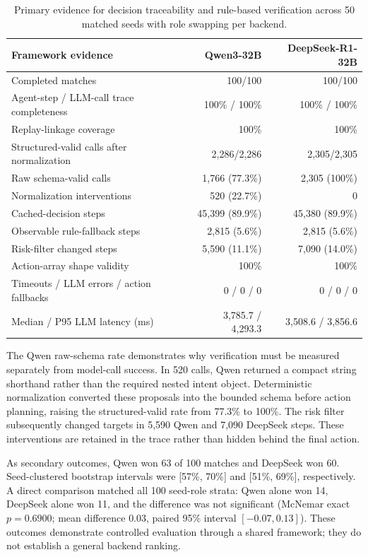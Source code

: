 \documentclass[11pt]{article}
\begin{document}
\begin{table}[t]
\centering
\small
\begin{tabular}{lrr}
\hline
Framework evidence & Qwen3-32B & DeepSeek-R1-32B \\
\hline
Completed matches & 100/100 & 100/100 \\
Agent-step / LLM-call trace completeness & 100\% / 100\% & 100\% / 100\% \\
Replay-linkage coverage & 100\% & 100\% \\
Structured-valid calls after normalization & 2,286/2,286 & 2,305/2,305 \\
Raw schema-valid calls & 1,766 (77.3\%) & 2,305 (100\%) \\
Normalization interventions & 520 (22.7\%) & 0 \\
Cached-decision steps & 45,399 (89.9\%) & 45,380 (89.9\%) \\
Observable rule-fallback steps & 2,815 (5.6\%) & 2,815 (5.6\%) \\
Risk-filter changed steps & 5,590 (11.1\%) & 7,090 (14.0\%) \\
Action-array shape validity & 100\% & 100\% \\
Timeouts / LLM errors / action fallbacks & 0 / 0 / 0 & 0 / 0 / 0 \\
Median / P95 LLM latency (ms) & 3,785.7 / 4,293.3 & 3,508.6 / 3,856.6 \\
\hline
\end{tabular}
\caption{Primary evidence for decision traceability and rule-based verification across 50 matched seeds with role swapping per backend.}
\label{tab:framework-evidence}
\end{table}

The Qwen raw-schema rate demonstrates why verification must be measured separately from model-call success. In 520 calls, Qwen returned a compact string shorthand rather than the required nested intent object. Deterministic normalization converted these proposals into the bounded schema before action planning, raising the structured-valid rate from 77.3\% to 100\%. The risk filter subsequently changed targets in 5,590 Qwen and 7,090 DeepSeek steps. These interventions are retained in the trace rather than hidden behind the final action.

As secondary outcomes, Qwen won 63 of 100 matches and DeepSeek won 60. Seed-clustered bootstrap intervals were [57\%, 70\%] and [51\%, 69\%], respectively. A direct comparison matched all 100 seed-role strata: Qwen alone won 14, DeepSeek alone won 11, and the difference was not significant (McNemar exact $p=0.6900$; mean difference $0.03$, paired 95\% interval $[-0.07,0.13]$). These outcomes demonstrate controlled evaluation through a shared framework; they do not establish a general backend ranking.
\end{document}
